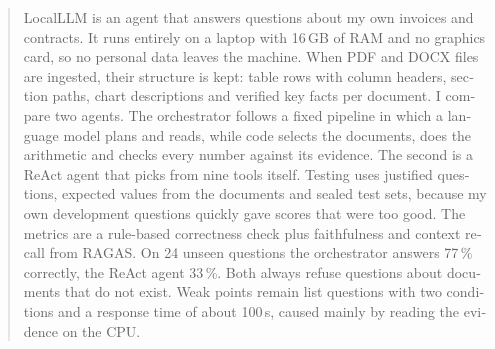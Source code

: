 \begin{otherlanguage}{english}
    \begin{abstract}
    LocalLLM is an agent that answers questions about my own invoices and contracts. It runs entirely on a laptop with 16\,GB of RAM and no graphics card, so no personal data leaves the machine. When PDF and DOCX files are ingested, their structure is kept: table rows with column headers, section paths, chart descriptions and verified key facts per document. I compare two agents. The orchestrator follows a fixed pipeline in which a language model plans and reads, while code selects the documents, does the arithmetic and checks every number against its evidence. The second is a ReAct agent that picks from nine tools itself. Testing uses justified questions, expected values from the documents and sealed test sets, because my own development questions quickly gave scores that were too good. The metrics are a rule-based correctness check plus faithfulness and context recall from RAGAS. On 24 unseen questions the orchestrator answers 77\,\% correctly, the ReAct agent 33\,\%. Both always refuse questions about documents that do not exist. Weak points remain list questions with two conditions and a response time of about 100\,s, caused mainly by reading the evidence on the CPU.
\end{abstract}
\end{otherlanguage}
